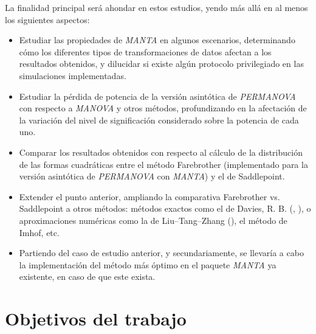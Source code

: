 \documentclass[IB,BIB]{TFUOC}%
\begin{document}
La finalidad principal será ahondar en estos estudios, yendo más allá en al menos los siguientes aspectos:

{\small
\begin{itemize}
    \item Estudiar las propiedades de \textit{MANTA} en algunos escenarios, determinando cómo los diferentes tipos de transformaciones de datos afectan a los resultados obtenidos, y dilucidar si existe algún protocolo privilegiado en las simulaciones implementadas.
    \item Estudiar la pérdida de potencia de la versión asintótica de \textit{PERMANOVA} con respecto a \textit{MANOVA} y otros métodos, profundizando en la afectación de la variación del nivel de significación considerado sobre la potencia de cada uno.
    \item Comparar los resultados obtenidos con respecto al cálculo de la distribución de las formas cuadráticas entre el método Farebrother (implementado para la versión asintótica de \textit{PERMANOVA} con \textit{MANTA}) y el de Saddlepoint.
    \item Extender el punto anterior, ampliando la comparativa Farebrother vs. Saddlepoint a otros métodos: métodos exactos como el de Davies, R. B. (\cite{davies_numerical_1973}, \cite{davies_algorithm_1980}), o aproximaciones numéricas como la de Liu–Tang–Zhang (\cite{qi_genetic_2022}), el método de Imhof, etc.
    \item Partiendo del caso de estudio anterior, y secundariamente, se llevaría a cabo la implementación del método más óptimo en el paquete \textit{MANTA} ya existente, en caso de que este exista.
\end{itemize}}


\section{Objetivos del trabajo}
\label{sec:Objetivos del trabajo}



%
\end{document}

